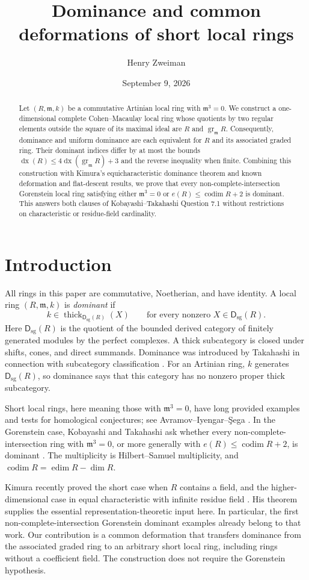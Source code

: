 \documentclass[11pt]{article}
\title{Dominance and common deformations of short local rings}
\author{Henry Zweiman}
\date{September 9, 2026}
\theoremstyle{remark}\newtheorem{remark}[theorem]{Remark}
\newcommand{\m}{\mathfrak m}
\newcommand{\gr}{\operatorname{gr}}
\newcommand{\edim}{\operatorname{edim}}
\newcommand{\codim}{\operatorname{codim}}
\newcommand{\dx}{\operatorname{dx}}
\newcommand{\Dsg}{\mathsf D_{\mathrm{sg}}}
\newcommand{\thick}{\operatorname{thick}}
\begin{document}
\maketitle
\begin{abstract}
Let $(R,\m,k)$ be a commutative Artinian local ring with $\m^3=0$. We construct a one-dimensional complete Cohen--Macaulay local ring whose quotients by two regular elements outside the square of its maximal ideal are $R$ and $\gr_{\m}R$. Consequently, dominance and uniform dominance are each equivalent for $R$ and its associated graded ring. Their dominant indices differ by at most the bounds $\dx(R)\le4\dx(\gr_{\m}R)+3$ and the reverse inequality when finite. Combining this construction with Kimura's equicharacteristic dominance theorem and known deformation and flat-descent results, we prove that every non-complete-intersection Gorenstein local ring satisfying either $\m^3=0$ or $e(R)\le\codim R+2$ is dominant. This answers both clauses of Kobayashi--Takahashi Question 7.1 without restrictions on characteristic or residue-field cardinality.
\end{abstract}

\section{Introduction}
All rings in this paper are commutative, Noetherian, and have identity. A local ring $(R,\m,k)$ is \emph{dominant} if
\[
 k\in\thick_{\Dsg(R)}(X)\qquad\text{for every nonzero }X\in\Dsg(R).
\]
Here $\Dsg(R)$ is the quotient of the bounded derived category of finitely generated modules by the perfect complexes. A thick subcategory is closed under shifts, cones, and direct summands. Dominance was introduced by Takahashi in connection with subcategory classification \cite{T}. For an Artinian ring, $k$ generates $\Dsg(R)$, so dominance says that this category has no nonzero proper thick subcategory.

Short local rings, here meaning those with $\m^3=0$, have long provided examples and tests for homological conjectures; see Avramov--Iyengar--\c Sega \cite{AIS}. In the Gorenstein case, Kobayashi and Takahashi ask whether every non-complete-intersection ring with $\m^3=0$, or more generally with $e(R)\le\codim R+2$, is dominant \cite[Question 7.1]{KT}. The multiplicity is Hilbert--Samuel multiplicity, and $\codim R=\edim R-\dim R$.

Kimura recently proved the short case when $R$ contains a field, and the higher-dimensional case in equal characteristic with infinite residue field \cite[Theorem 7.3]{K}. His theorem supplies the essential representation-theoretic input here. In particular, the first non-complete-intersection Gorenstein dominant examples already belong to that work. Our contribution is a common deformation that transfers dominance from the associated graded ring to an arbitrary short local ring, including rings without a coefficient field. The construction does not require the Gorenstein hypothesis.
\end{document}
